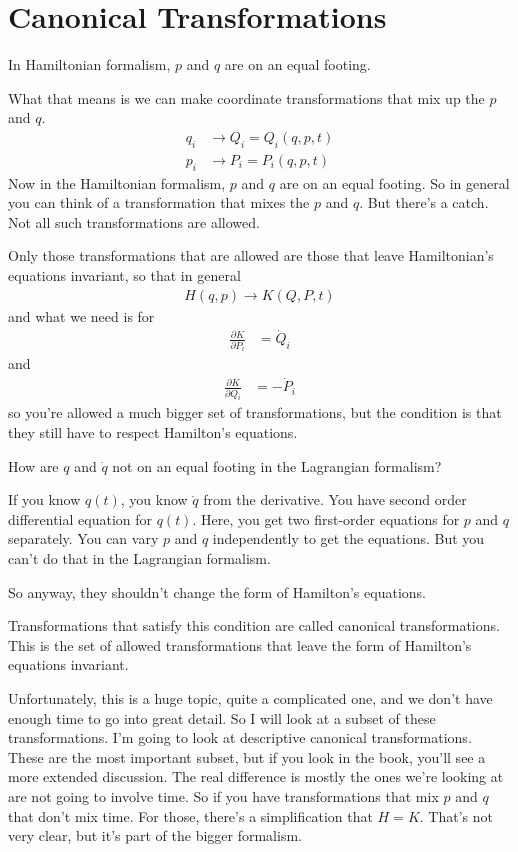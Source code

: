\section{Canonical Transformations}
In Hamiltonian formalism,
$p$ and $q$ are on an equal footing.

What that means is we can make coordinate transformations that mix up the $p$
and $q$.
\begin{align}
    q_i &\to Q_i = Q_i\left( q, p, t  \right)\\
    p_i &\to P_i = P_i\left( q, p, t  \right)
\end{align}
Now in the Hamiltonian formalism,
$p$ and $q$ are on an equal footing.
So in general you can think of a transformation that mixes the $p$ and $q$.
But there's a catch.
Not all such transformations are allowed.

Only those transformations that are allowed are those that leave Hamiltonian's
equations invariant,
so that in general
\begin{align}
    H(q, p) \to K(Q, P, t)
\end{align}
and what we need is for
\begin{align}
    \frac{\partial K}{\partial P_i} &= \dot{Q}_i
\end{align}
and
\begin{align}
    \frac{\partial K}{\partial Q_i} &= -\dot{P}_i
\end{align}
so you're allowed a much bigger set of transformations,
but the condition is that they still have to respect Hamilton's equations.

\begin{question}
    How are $q$ and $\dot{q}$ not on an equal footing in the Lagrangian
    formalism?
\end{question}
If you know $q(t)$,
you know $\dot{q}$ from the derivative.
You have second order differential equation for $q(t)$.
Here,
you get two first-order equations for $p$ and $q$ separately.
You can vary $p$ and $q$ independently to get the equations.
But you can't do that in the Lagrangian formalism.

So anyway,
they shouldn't change the form of Hamilton's equations.

Transformations that satisfy this condition are called canonical
transformations.
This is the set of allowed transformations that leave the form of Hamilton's
equations invariant.

Unfortunately,
this is a huge topic,
quite a complicated one,
and we don't have enough time to go into great detail.
So I will look at a subset of these transformations.
I'm going to look at descriptive canonical transformations.
These are the most important subset,
but if you look in the book,
you'll see a more extended discussion.
The real difference is mostly the ones we're looking at are not going to
involve time.
So if you have transformations that mix $p$ and $q$ that don't mix time.
For those,
there's a simplification that $H=K$.
That's not very clear,
but it's part of the bigger formalism.

